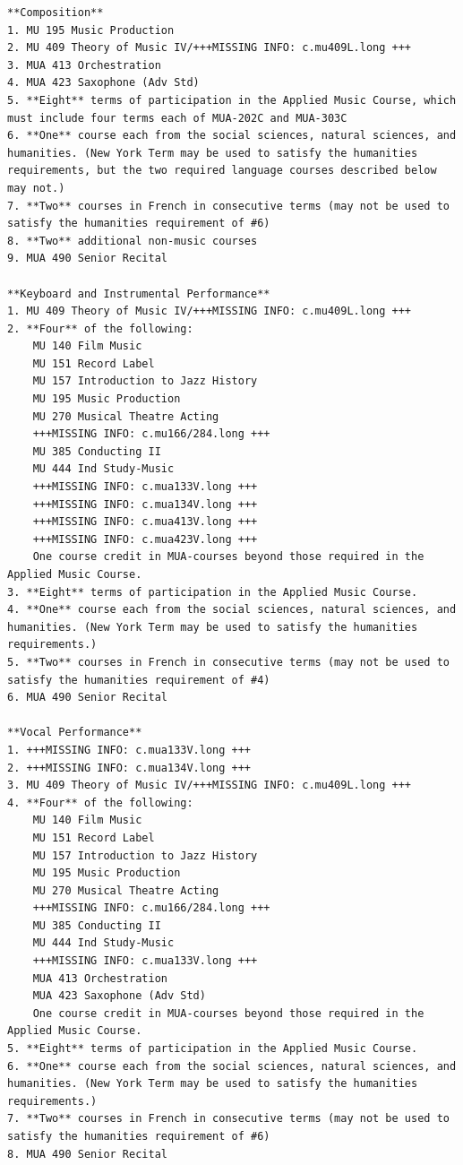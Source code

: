 \documentclass[
  letterpaper,
]{scrbook}
\begin{document}
\begin{verbatim}
**Composition**
1. MU 195 Music Production
2. MU 409 Theory of Music IV/+++MISSING INFO: c.mu409L.long +++
3. MUA 413 Orchestration
4. MUA 423 Saxophone (Adv Std)
5. **Eight** terms of participation in the Applied Music Course, which must include four terms each of MUA-202C and MUA-303C
6. **One** course each from the social sciences, natural sciences, and humanities. (New York Term may be used to satisfy the humanities requirements, but the two required language courses described below may not.) 
7. **Two** courses in French in consecutive terms (may not be used to satisfy the humanities requirement of #6) 
8. **Two** additional non-music courses 
9. MUA 490 Senior Recital

**Keyboard and Instrumental Performance**
1. MU 409 Theory of Music IV/+++MISSING INFO: c.mu409L.long +++
2. **Four** of the following:
    MU 140 Film Music
    MU 151 Record Label
    MU 157 Introduction to Jazz History
    MU 195 Music Production
    MU 270 Musical Theatre Acting
    +++MISSING INFO: c.mu166/284.long +++
    MU 385 Conducting II
    MU 444 Ind Study-Music
    +++MISSING INFO: c.mua133V.long +++
    +++MISSING INFO: c.mua134V.long +++
    +++MISSING INFO: c.mua413V.long +++
    +++MISSING INFO: c.mua423V.long +++
    One course credit in MUA-courses beyond those required in the Applied Music Course.
3. **Eight** terms of participation in the Applied Music Course. 
4. **One** course each from the social sciences, natural sciences, and humanities. (New York Term may be used to satisfy the humanities requirements.) 
5. **Two** courses in French in consecutive terms (may not be used to satisfy the humanities requirement of #4)
6. MUA 490 Senior Recital

**Vocal Performance**
1. +++MISSING INFO: c.mua133V.long +++
2. +++MISSING INFO: c.mua134V.long +++
3. MU 409 Theory of Music IV/+++MISSING INFO: c.mu409L.long +++
4. **Four** of the following:
    MU 140 Film Music
    MU 151 Record Label
    MU 157 Introduction to Jazz History
    MU 195 Music Production
    MU 270 Musical Theatre Acting
    +++MISSING INFO: c.mu166/284.long +++
    MU 385 Conducting II
    MU 444 Ind Study-Music
    +++MISSING INFO: c.mua133V.long +++
    MUA 413 Orchestration
    MUA 423 Saxophone (Adv Std)
    One course credit in MUA-courses beyond those required in the Applied Music Course. 
5. **Eight** terms of participation in the Applied Music Course. 
6. **One** course each from the social sciences, natural sciences, and humanities. (New York Term may be used to satisfy the humanities requirements.) 
7. **Two** courses in French in consecutive terms (may not be used to satisfy the humanities requirement of #6) 
8. MUA 490 Senior Recital


\end{verbatim}
\end{document}

